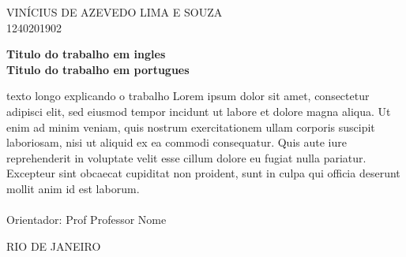 \begin{center}

    \large {VINÍCIUS DE AZEVEDO LIMA E SOUZA \\ 1240201902}
    

    \vfill

    \Large\textbf{Titulo do trabalho em ingles} \\ [1em]

    \Large\textbf{Titulo do trabalho em portugues}

\end{center}

\vspace{3em}

\begin{adjustwidth}{7.5cm}{}
    \noindent texto longo explicando o trabalho Lorem ipsum dolor sit amet, consectetur adipisci elit, sed eiusmod tempor incidunt ut labore et dolore magna aliqua. Ut enim ad minim veniam, quis nostrum exercitationem ullam corporis suscipit laboriosam, nisi ut aliquid ex ea commodi consequatur. Quis aute iure reprehenderit in voluptate velit esse cillum dolore eu fugiat nulla pariatur. Excepteur sint obcaecat cupiditat non proident, sunt in culpa qui officia deserunt mollit anim id est laborum. \\ \ \\
    Orientador: Prof Professor Nome
\end{adjustwidth}

\vfill

\begin{center}

    \large
    
    RIO DE JANEIRO \\
    \the \year
    
    \newpage
\end{center}